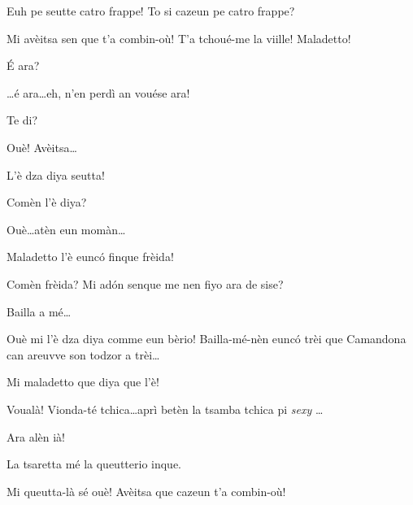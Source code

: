\begin{drama}
\Marcospeaks Euh pe seutte catro frappe! To si cazeun pe catro frappe?

\Cimaspeaks Mi avèitsa  sen que t'a combin-où! T'a tchoué-me la viille! Maladetto!

\Marcospeaks \'E ara?

\Cimaspeaks  \ldots é ara\ldots eh, n'en perdì an vouése ara!

\Marcospeaks Te di?

\Cimaspeaks Ouè! Avèitsa\ldots


\Cimaspeaks L'è dza diya seutta!

\Marcospeaks Comèn l'è diya?

\Cimaspeaks Ouè\ldots atèn eun momàn\ldots


\Cimaspeaks Maladetto l'è eunc\'o finque frèida!

\Marcospeaks {} Comèn frèida? Mi ad\'on senque me nen fiyo ara de sise? 

\Cimaspeaks Bailla a mé\ldots


\Cimaspeaks Ouè mi l'è dza diya comme eun bèrio! Bailla-mé-nèn eunc\'o trèi que Camandona can areuvve son todzor a trèi\ldots


\Cimaspeaks Mi maladetto que diya que l'è!

\Cimaspeaks {} Voualà! Vionda-té tchica\ldots aprì betèn la tsamba tchica pi \textit{sexy} \ldots 


\Cimaspeaks Ara alèn ià!

\Marcospeaks La tsaretta mé la queutterio inque.

\Cimaspeaks Mi queutta-là sé ouè! Avèitsa que cazeun t'a combin-où!


\end{drama}
